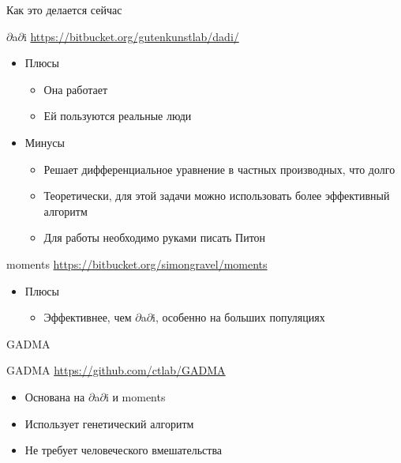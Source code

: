 \documentclass[presentation, smaller]{beamer}
\newcommand{\dadi}{$\partial$a$\partial$i\xspace }
\begin{document}
\begin{frame}[label={sec:org74d1369}]{Как это делается сейчас}
\begin{block}{\dadi}
\url{https://bitbucket.org/gutenkunstlab/dadi/}
\begin{itemize}
\item Плюсы
\begin{itemize}
\item Она работает
\item Ей пользуются реальные люди
\end{itemize}
\item Минусы
\begin{itemize}
\item Решает дифференциальное уравнение в частных производных, что долго
\item Теоретически, для этой задачи можно использовать более эффективный алгоритм
\item Для работы необходимо руками писать Питон
\end{itemize}
\end{itemize}
\end{block}

\begin{block}{moments}
\url{https://bitbucket.org/simongravel/moments}
\begin{itemize}
\item Плюсы
\begin{itemize}
\item Эффективнее, чем \dadi, особенно на больших популяциях
\end{itemize}
\end{itemize}
\end{block}
\end{frame}

\begin{frame}[label={sec:org6b4e01b}]{GADMA}
\begin{block}{GADMA}
\url{https://github.com/ctlab/GADMA}
\begin{itemize}
\item Основана на \dadi и moments
\item Использует генетический алгоритм
\item Не требует человеческого вмешательства
\end{itemize}
\end{block}
\end{frame}
\end{document}

